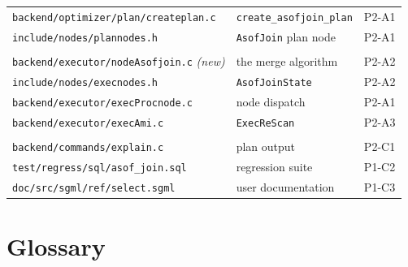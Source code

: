 \documentclass[11pt,a4paper]{report}
\theoremstyle{definition}
\theoremstyle{plain}
\newcommand{\code}[1]{\texttt{\small #1}}
\newcommand{\file}[1]{\texttt{\footnotesize #1}}
\begin{document}
\begin{table}[h]
\begin{tabular}{@{}p{6.6cm}p{5.3cm}p{1.5cm}@{}}
\file{backend/optimizer/plan/createplan.c} & \code{create\_asofjoin\_plan} & P2-A1\\
\file{include/nodes/plannodes.h} & \code{AsofJoin} plan node & P2-A1\\
\addlinespace
\multicolumn{3}{@{}l}{\textit{Executor}}\\
\file{backend/executor/nodeAsofjoin.c} \textit{(new)} & the merge algorithm & P2-A2\\
\file{include/nodes/execnodes.h} & \code{AsofJoinState} & P2-A2\\
\file{backend/executor/execProcnode.c} & node dispatch & P2-A1\\
\file{backend/executor/execAmi.c} & \code{ExecReScan} & P2-A3\\
\addlinespace
\multicolumn{3}{@{}l}{\textit{Surface \& tests}}\\
\file{backend/commands/explain.c} & plan output & P2-C1\\
\file{test/regress/sql/asof\_join.sql} & regression suite & P1-C2\\
\file{doc/src/sgml/ref/select.sgml} & user documentation & P1-C3\\
\bottomrule
\end{tabular}
\end{table}

\chapter{Glossary}
\end{document}
